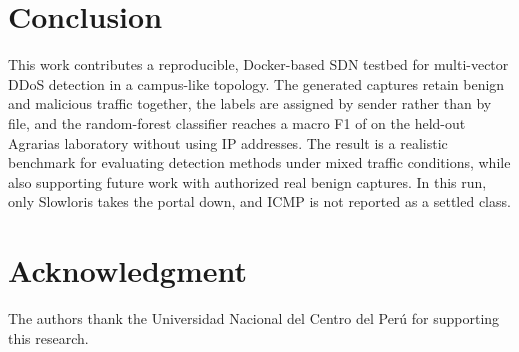 \documentclass[lettersize,journal]{IEEEtran}
\begin{document}
\section{Conclusion}
This work contributes a reproducible, Docker-based SDN testbed for multi-vector DDoS detection in a campus-like topology. The generated captures retain benign and malicious traffic together, the labels are assigned by sender rather than by file, and the random-forest classifier reaches a macro F1 of \Fmacro on the held-out Agrarias laboratory without using IP addresses. The result is a realistic benchmark for evaluating detection methods under mixed traffic conditions, while also supporting future work with authorized real benign captures. In this run, only Slowloris takes the portal down, and ICMP is not reported as a settled class.

\section*{Acknowledgment}
The authors thank the Universidad Nacional del Centro del Per\'u for supporting this research.



\end{document}
